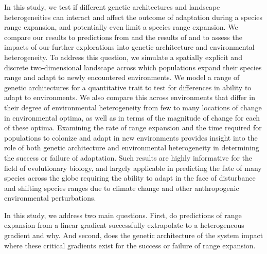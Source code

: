 In this study, we test if different genetic architectures and landscape heterogeneities can interact and affect the outcome of adaptation during a species range expansion, and potentially even limit a species range expansion. We compare our results to predictions from \citet{Barton:2001} and the results of \citet{Bridle:2010} and \citet{Schiffers:2014} to assess the impacts of our further explorations into genetic architecture and environmental heterogeneity. 
To address this question, we simulate a spatially explicit and discrete two-dimensional landscape across which populations expand their species range and adapt to newly encountered environments. We model a range of genetic architectures for a quantitative trait to test for differences in ability to adapt to environments. We also compare this across environments that differ in their degree of environmental heterogeneity from few to many locations of change in environmental optima, as well as in terms of the magnitude of change for each of these optima. Examining the rate of range expansion and the time required for populations to colonize and adapt in new environments provides insight into the role of both genetic architecture and environmental heterogeneity in determining the success or failure of adaptation. Such results are highly informative for the field of evolutionary biology, and largely applicable in predicting the fate of many species across the globe requiring the ability to adapt in the face of disturbance and shifting species ranges due to climate change and other anthropogenic environmental perturbations.

In this study, we address two main questions. First, do predictions of range expansion from a linear gradient successfully extrapolate to a heterogeneous gradient and why. And second, does the genetic architecture of the system impact where these critical gradients exist for the success or failure of range expansion.






